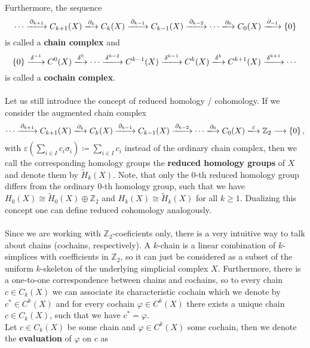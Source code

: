 Furthermore, the sequence
\[
\cdots\xlongrightarrow{\partial_{k+1}} C_{k+1}(X)\xlongrightarrow{\partial_k} C_k(X)\xlongrightarrow{\partial_{k-1}} C_{k-1}(X)\xlongrightarrow{\partial_{k-2}}\cdots\xlongrightarrow{\partial_0} C_0(X)\xlongrightarrow{\partial_{-1}}\left\{0\right\}
\]
is called a \textbf{chain complex} and
\[
\left\{0\right\}\xlongrightarrow{\delta^{-1}}C^0(X)\xlongrightarrow{\delta^0}\cdots\xlongrightarrow{\delta^{k-2}} C^{k-1}(X)\xlongrightarrow{\delta^{k-1}} C^k(X)\xlongrightarrow{\delta^k} C^{k+1}(X)\xlongrightarrow{\delta^{k+1}}\cdots
\]
is called a \textbf{cochain complex}.\\
\\
Let us still introduce the concept of reduced homology / cohomology. If we consider the augmented chain complex
\[
\cdots\xlongrightarrow{\partial_{k+1}} C_{k+1}(X)\xlongrightarrow{\partial_k} C_k(X)\xlongrightarrow{\partial_{k-1}} C_{k-1}(X)\xlongrightarrow{\partial_{k-2}}\cdots\xlongrightarrow{\partial_0} C_0(X)\xlongrightarrow{\varepsilon}\mathbb{Z}_2\longrightarrow \left\{0\right\},
\]
with \(\varepsilon\left(\sum\limits_{i\in I}c_i\sigma_i\right)\coloneqq \sum\limits_{i\in I}c_i\) instead of the ordinary chain complex, then we call the corresponding homology groups the \textbf{reduced homology groups} of \(X\) and denote them by \(\tilde{H}_k(X)\). Note, that only the \(0\)-th reduced homology group differs from the ordinary \(0\)-th homology group, such that we have \(H_0(X)\cong\tilde{H}_0(X)\oplus\mathbb{Z}_2\) and \(H_k(X)\cong\tilde{H}_k(X)\) for all \(k\geq 1\). Dualizing this concept one can define reduced cohomology analogously.\\
\\
Since we are working with \(\mathbb{Z}_2\)-coeficients only, there is a very intuitive way to talk about chains (cochains, respectively). A \(k\)-chain is a linear combination of \(k\)-simplices with coefficients in \(\mathbb{Z}_2\), so it can just be considered as a subset of the uniform \(k\)-skeleton of the underlying simplicial complex \(X\). Furthermore, there is a one-to-one correspondence between chains and cochains, so to every chain \(c\in C_k(X)\) we can associate its characteristic cochain which we denote by \(c^*\in C^k(X)\) and for every cochain \(\varphi\in C^k(X)\) there exists a unique chain \(c\in C_k(X)\), such that we have \(c^*=\varphi\).\\
Let \(c\in C_k(X)\) be some chain and \(\varphi\in C^k(X)\) some cochain, then we denote the \textbf{evaluation} of \(\varphi\) on \(c\) as
